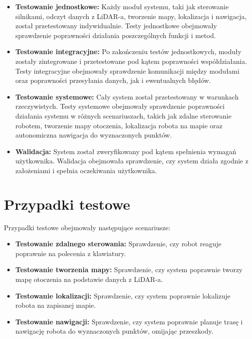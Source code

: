 \documentclass[a4paper,twoside,12pt]{book}
\begin{document}
\begin{itemize}
	\item \textbf{Testowanie jednostkowe:} Każdy moduł systemu, taki jak sterowanie silnikami, odczyt danych z LiDAR-a, tworzenie mapy, lokalizacja i nawigacja, został przetestowany indywidualnie. Testy jednostkowe obejmowały sprawdzenie poprawności działania poszczególnych funkcji i metod.
	\item \textbf{Testowanie integracyjne:} Po zakończeniu testów jednostkowych, moduły zostały zintegrowane i przetestowane pod kątem poprawności współdziałania. Testy integracyjne obejmowały sprawdzenie komunikacji między modułami oraz poprawności przesyłania danych, jak i ewentualnych błędów.
	\item \textbf{Testowanie systemowe:} Cały system został przetestowany w warunkach rzeczywistych. Testy systemowe obejmowały sprawdzenie poprawności działania systemu w różnych scenariuszach, takich jak zdalne sterowanie robotem, tworzenie mapy otoczenia, lokalizacja robota na mapie oraz autonomiczna nawigacja do wyznaczonych punktów.
	\item \textbf{Walidacja:} System został zweryfikowany pod kątem spełnienia wymagań użytkownika. Walidacja obejmowała sprawdzenie, czy system działa zgodnie z założeniami i spełnia oczekiwania użytkownika.
\end{itemize}

\section{Przypadki testowe}
Przypadki testowe obejmowały następujące scenariusze:
\begin{itemize}
	\item \textbf{Testowanie zdalnego sterowania:} Sprawdzenie, czy robot reaguje poprawnie na polecenia z klawiatury.
	\item \textbf{Testowanie tworzenia mapy:} Sprawdzenie, czy system poprawnie tworzy mapę otoczenia na podstawie danych z LiDAR-a.
	\item \textbf{Testowanie lokalizacji:} Sprawdzenie, czy system poprawnie lokalizuje robota na zapisanej mapie.
	\item \textbf{Testowanie nawigacji:} Sprawdzenie, czy system poprawnie planuje trasę i nawigację robota do wyznaczonych punktów, omijając przeszkody.
\end{itemize}
\end{document}
